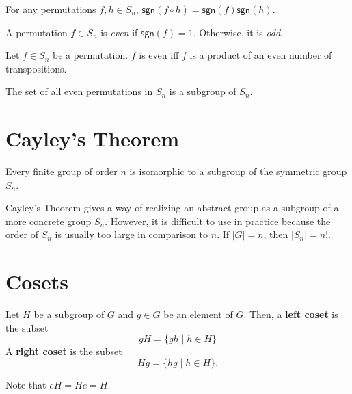\documentclass{article}
\begin{document}
\begin{proposition}
  For any permutations $f, h \in S_n$, $\mathsf{sgn}(f \circ h) = \mathsf{sgn}(f) \mathsf{sgn}(h)$.
\end{proposition}

\begin{definition}
  A permutation $f \in S_n$ is \emph{even} if $\mathsf{sgn}(f) = 1$. Otherwise, it is \emph{odd}.
\end{definition}

\begin{theorem}
  Let $f \in S_n$ be a permutation. $f$ is even iff $f$ is a product of an even number of transpositions.
\end{theorem}

\begin{proposition}
  The set of all even permutations in $S_n$ is a subgroup of $S_n$.
\end{proposition}

\section{Cayley's Theorem}

\begin{theorem}
  Every finite group of order $n$ is isomorphic to a subgroup of the symmetric group $S_n$.
\end{theorem}

Cayley's Theorem gives a way of realizing an abstract group as a subgroup of a more concrete group $S_n$. However, it is difficult to use in practice because the order of $S_n$ is usually too large in comparison to $n$. If $|G| = n$, then $|S_n| = n!$.

\section{Cosets}

\begin{definition}[Coset]
  Let $H$ be a subgroup of $G$ and $g \in G$ be an element of $G$. Then, a \textbf{left coset} is the subset
  $$
    gH = \{gh \mid h \in H\}
  $$
  A \textbf{right coset} is the subset
  $$
    Hg = \{hg \mid h \in H\}.
  $$
\end{definition}

Note that $eH = He = H$.
\end{document}
